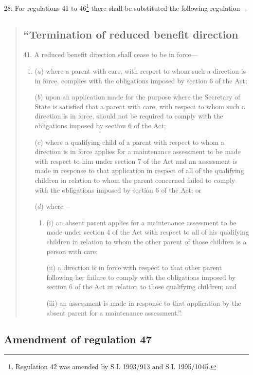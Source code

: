 \documentclass[12pt,a4paper]{article}
\begin{document}
28.  For regulations 41 to 46\footnote{\frenchspacing Regulation 42 was amended by S.I. 1993/913 and S.I. 1995/1045.} there shall be substituted the following regulation---
\begin{quotation}
\subsection*{“Termination of reduced benefit direction}

41.  A reduced benefit direction shall cease to be in force---
\begin{enumerate}\item[]
($a$) where a parent with care, with respect to whom such a direction is in force, complies with the obligations imposed by section 6 of the Act;

($b$) upon an application made for the purpose where the Secretary of State is satisfied that a parent with care, with respect to whom such a direction is in force, should not be required to comply with the obligations imposed by section 6 of the Act;

($c$) where a qualifying child of a parent with respect to whom a direction is in force applies for a maintenance assessment to be made with respect to him under section 7 of the Act and an assessment is made in response to that application in respect of all of the qualifying children in relation to whom the parent concerned failed to comply with the obligations imposed by section 6 of the Act; or

($d$) where---
\begin{enumerate}\item[]
(i) an absent parent applies for a maintenance assessment to be made under section 4 of the Act with respect to all of his qualifying children in relation to whom the other parent of those children is a person with care;

(ii) a direction is in force with respect to that other parent following her failure to comply with the obligations imposed by section 6 of the Act in relation to those qualifying children; and

(iii) an assessment is made in response to that application by the absent parent for a maintenance assessment.”.
\end{enumerate}
\end{enumerate}
\end{quotation}

\subsection[29. Amendment of regulation 47]{Amendment of regulation 47}
\end{document}
